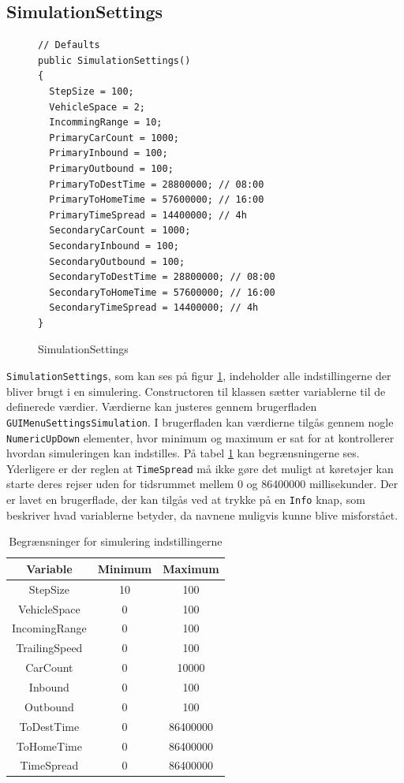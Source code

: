 \subsection*{SimulationSettings}
\begin{figure}[H]
\begin{lstlisting} 
// Defaults
public SimulationSettings()
{
  StepSize = 100;
  VehicleSpace = 2;
  IncommingRange = 10;
  PrimaryCarCount = 1000;
  PrimaryInbound = 100;
  PrimaryOutbound = 100;
  PrimaryToDestTime = 28800000; // 08:00
  PrimaryToHomeTime = 57600000; // 16:00
  PrimaryTimeSpread = 14400000; // 4h
  SecondaryCarCount = 1000;
  SecondaryInbound = 100;
  SecondaryOutbound = 100;
  SecondaryToDestTime = 28800000; // 08:00
  SecondaryToHomeTime = 57600000; // 16:00
  SecondaryTimeSpread = 14400000; // 4h
}
\end{lstlisting}
\caption{SimulationSettings}\label{SimulationSettings}
\end{figure}

\texttt{SimulationSettings}, som kan ses på figur \ref{SimulationSettings}, indeholder alle indstillingerne der bliver brugt i en simulering. Constructoren til klassen sætter variablerne til de definerede værdier. Værdierne kan justeres gennem brugerfladen \newline \texttt{GUIMenuSettingsSimulation}. I brugerfladen kan værdierne tilgås gennem nogle \texttt{NumericUpDown} elementer, hvor minimum og maximum er sat for at kontrollerer hvordan simuleringen kan indstilles. På tabel \ref{SimulationLimits} kan begrænsningerne ses. Yderligere er der reglen at \texttt{TimeSpread} må ikke gøre det muligt at køretøjer kan starte deres rejser uden for tidsrummet mellem 0 og 86400000 millisekunder. Der er lavet en brugerflade, der kan tilgås ved at trykke på en \texttt{Info} knap, som beskriver hvad variablerne betyder, da navnene muligvis kunne blive misforstået.

\begin{table}[H]
\centering
\begin{tabular}{| c | c | c |}
  \hline
Variable & Minimum & Maximum \\
  \hline
StepSize & 10 & 100 \\
  \hline
VehicleSpace & 0 & 100 \\
  \hline
IncomingRange & 0 & 100 \\
  \hline
TrailingSpeed & 0 & 100 \\
  \hline
CarCount & 0 & 10000 \\
  \hline
Inbound & 0 & 100 \\
  \hline
Outbound & 0 & 100 \\
  \hline
ToDestTime & 0 & 86400000 \\
  \hline
ToHomeTime & 0 & 86400000 \\
  \hline
TimeSpread & 0 & 86400000 \\
  \hline
\end{tabular}
\caption{Begrænsninger for simulering indstillingerne}\label{SimulationLimits}
\end{table}

